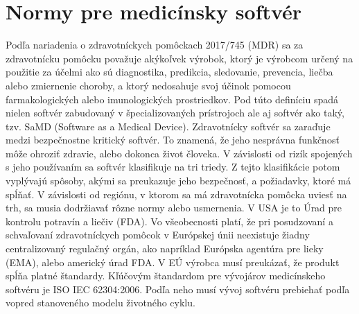\documentclass[10pt,twoside,slovak,a4paper]{article}
\begin{document}
\section{Normy pre medicínsky softvér}%
Podľa nariadenia o zdravotníckych pomôckach 2017/745 (MDR) sa za zdravotnícku pomôcku považuje akýkoľvek výrobok, ktorý je výrobcom určený na použitie za účelmi ako sú diagnostika, predikcia, sledovanie, prevencia, liečba alebo zmiernenie choroby, a ktorý nedosahuje svoj účinok pomocou farmakologických alebo imunologických prostriedkov. Pod túto definíciu spadá nielen softvér zabudovaný v špecializovaných prístrojoch ale aj softvér ako taký, tzv. SaMD (Software as a Medical Device). Zdravotnícky softvér sa zaraďuje medzi bezpečnostne kritický softvér. To znamená, že jeho nesprávna funkčnosť môže ohroziť zdravie, alebo dokonca život človeka. V závislosti od rizík spojených s jeho používaním sa softvér klasifikuje na tri triedy. Z tejto klasifikácie potom vyplývajú spôsoby, akými sa preukazuje jeho bezpečnosť, a požiadavky, ktoré má spĺňať. V závislosti od regiónu, v ktorom sa má zdravotnícka pomôcka uviesť na trh, sa musia dodržiavať rôzne normy alebo usmernenia. V USA je to Úrad pre kontrolu potravín a liečiv (FDA). Vo všeobecnosti platí, že pri posudzovaní a schvaľovaní zdravotníckych pomôcok v Európskej únii neexistuje žiadny centralizovaný regulačný orgán, ako napríklad Európska agentúra pre lieky (EMA), alebo americký úrad FDA. V EÚ výrobca musí preukázať, že produkt spĺňa platné štandardy. Kľúčovým štandardom pre vývojárov medicínskeho softvéru je ISO IEC 62304:2006\cite{bronneke2021}. Podľa neho musí vývoj softvéru prebiehať podľa vopred stanoveného modelu životného cyklu.
\end{document}
